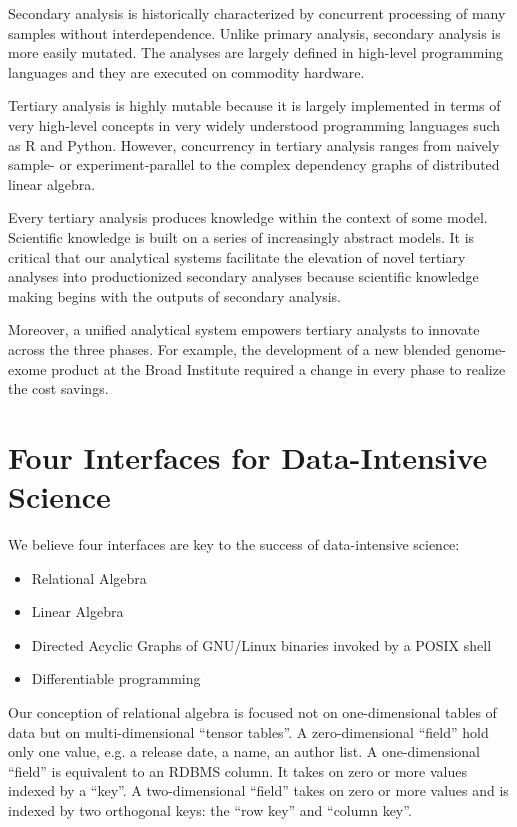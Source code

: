 \documentclass[10pt]{article}
\begin{document}
Secondary analysis is historically characterized by concurrent processing of many samples without interdependence. Unlike primary analysis, secondary analysis is more easily mutated. The analyses are largely defined in high-level programming languages and they are executed on commodity hardware. %
%

Tertiary analysis is highly mutable because it is largely implemented in terms of very high-level concepts in very widely understood programming languages such as R and Python. However, concurrency in tertiary analysis ranges from naively sample- or experiment-parallel to the complex dependency graphs of distributed linear algebra. %
%

Every tertiary analysis produces knowledge within the context of some model. Scientific knowledge is built on a series of increasingly abstract models. It is critical that our analytical systems facilitate the elevation of novel tertiary analyses into productionized secondary analyses because scientific knowledge making begins with the outputs of secondary analysis.

Moreover, a unified analytical system empowers tertiary analysts to innovate across the three phases. For example, the development of a new blended genome-exome product at the Broad Institute required a change in every phase to realize the cost savings.

\section{Four Interfaces for Data-Intensive Science}

We believe four interfaces are key to the success of data-intensive science:

\begin{itemize}
\item Relational Algebra
\item Linear Algebra
\item Directed Acyclic Graphs of GNU/Linux binaries invoked by a POSIX shell
\item Differentiable programming
\end{itemize}

Our conception of relational algebra is focused not on one-dimensional tables of data but on multi-dimensional ``tensor tables''. A zero-dimensional ``field'' hold only one value, e.g. a release date, a name, an author list. A one-dimensional ``field'' is equivalent to an RDBMS column. It takes on zero or more values indexed by a ``key''. A two-dimensional ``field'' takes on zero or more values and is indexed by two orthogonal keys: the ``row key'' and ``column key''.
\end{document}
